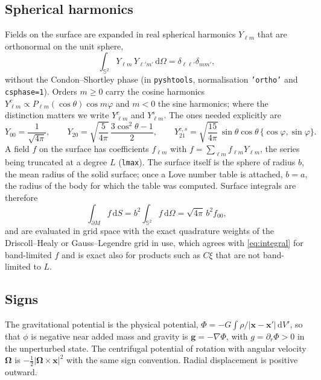 \documentclass[11pt,a4paper]{article}
\newcommand{\dd}{\mathrm{d}}
\newcommand{\x}{\mathbf{x}}
\newcommand{\grad}{\nabla}
\newcommand{\Ylm}{Y_{\ell m}}
\newcommand{\code}[1]{\texttt{#1}}
\newcommand{\sph}{\mathbb{S}^2}
\numberwithin{equation}{section}
\begin{document}
\subsection{Spherical harmonics}

Fields on the surface are expanded in real spherical harmonics $\Ylm$ that are
orthonormal on the unit sphere,
\begin{equation}
\int_{\sph} \Ylm\, Y_{\ell' m'}\,\dd\Omega = \delta_{\ell\ell'}\delta_{mm'},
\end{equation}
without the Condon--Shortley phase (in \texttt{pyshtools}, normalisation
\code{'ortho'} and \code{csphase=1}). Orders $m\ge 0$ carry the cosine
harmonics $Y^{c}_{\ell m}\propto P_{\ell m}(\cos\theta)\cos m\varphi$ and $m<0$
the sine harmonics; where the distinction matters we write
$Y^{c}_{\ell m}$ and $Y^{s}_{\ell m}$. The ones needed explicitly are
\begin{equation}
Y_{00} = \frac{1}{\sqrt{4\pi}},\qquad
Y_{20} = \sqrt{\frac{5}{4\pi}}\,\frac{3\cos^{2}\theta-1}{2},\qquad
Y^{c,s}_{21} = \sqrt{\frac{15}{4\pi}}\,\sin\theta\cos\theta\,
\{\cos\varphi,\sin\varphi\}.
\label{eq:Y2}
\end{equation}
A field $f$ on the surface has coefficients $f_{\ell m}$ with
$f=\sum_{\ell m} f_{\ell m}\Ylm$, the series being truncated at a degree $L$
(\code{lmax}). The surface itself is the sphere of radius $b$, the mean radius
of the solid surface; once a Love number table is attached, $b=a$, the radius
of the body for which the table was computed. Surface integrals are therefore
\begin{equation}
\int_{\partial M} f\,\dd S = b^{2}\int_{\sph} f\,\dd\Omega = \sqrt{4\pi}\,b^{2} f_{00},
\label{eq:integral}
\end{equation}
and are evaluated in grid space with the exact quadrature weights of the
Driscoll--Healy or Gauss--Legendre grid in use, which agrees with
\eqref{eq:integral} for band-limited $f$ and is exact also for products such as
$C\xi$ that are not band-limited to $L$.

\subsection{Signs}

The gravitational potential is the physical potential, $\Phi=-G\int\rho/|\x-\x'|\,\dd V'$,
so that $\phi$ is negative near added mass and gravity is $\mathbf{g}=-\grad\Phi$,
with $g=\partial_r\Phi>0$ in the unperturbed state. The centrifugal potential
of rotation with angular velocity $\bm{\Omega}$ is
$-\tfrac12|\bm{\Omega}\times\x|^{2}$ with the same sign convention. Radial
displacement is positive outward.
\end{document}
